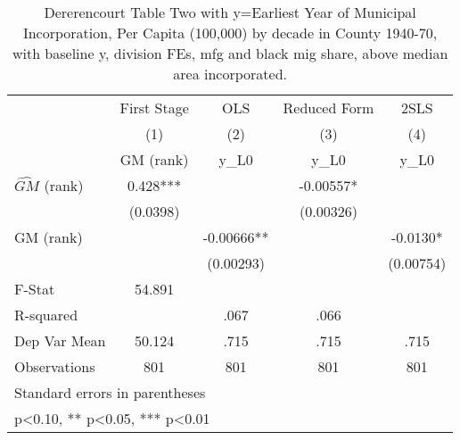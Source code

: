 \begin{table}[htbp]\centering
\def\sym#1{\ifmmode^{#1}\else\(^{#1}\)\fi}
\caption{Dererencourt Table Two with y=Earliest Year of Municipal Incorporation, Per Capita (100,000) by decade in County 1940-70, with baseline y, division FEs, mfg and black mig share, above median area incorporated.}
\begin{tabular}{l*{4}{c}}
\toprule
                    & First Stage   &         OLS   &Reduced Form   &        2SLS   \\
                    &\multicolumn{1}{c}{(1)}&\multicolumn{1}{c}{(2)}&\multicolumn{1}{c}{(3)}&\multicolumn{1}{c}{(4)}\\
                    &\multicolumn{1}{c}{GM  (rank)}&\multicolumn{1}{c}{y\_L0}&\multicolumn{1}{c}{y\_L0}&\multicolumn{1}{c}{y\_L0}\\
\midrule
$\hat{GM}$ (rank)   &       0.428***&               &    -0.00557*  &               \\
                    &    (0.0398)   &               &   (0.00326)   &               \\
\addlinespace
GM  (rank)          &               &    -0.00666** &               &     -0.0130*  \\
                    &               &   (0.00293)   &               &   (0.00754)   \\
\midrule
F-Stat              &      54.891   &               &               &               \\
R-squared           &               &        .067   &        .066   &               \\
Dep Var Mean        &      50.124   &        .715   &        .715   &        .715   \\
Observations        &         801   &         801   &         801   &         801   \\
\bottomrule
\multicolumn{5}{l}{\footnotesize Standard errors in parentheses}\\
\multicolumn{5}{l}{\footnotesize * p<0.10, ** p<0.05, *** p<0.01}\\
\end{tabular}
\end{table}
